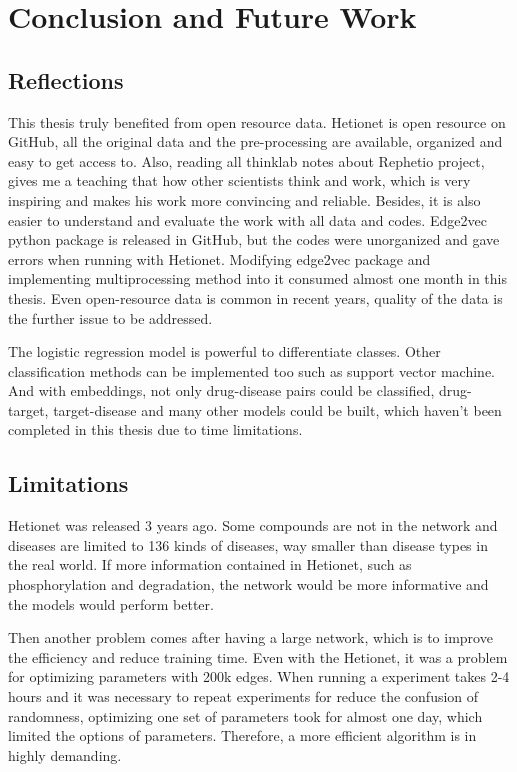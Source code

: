 \chapter{Conclusion and Future Work}\label{conclusion}
\section{Reflections}

This thesis truly benefited from open resource data. Hetionet is open resource on GitHub, all the original data and the pre-processing are available, organized and easy to get access to. Also, reading all thinklab notes about Rephetio project, gives me a teaching that how other scientists think and work, which is very inspiring and makes his work more convincing and reliable. Besides, it is also easier to understand and evaluate the work with all data and codes. Edge2vec python package is released in GitHub, but the codes were unorganized and gave errors when running with Hetionet. Modifying edge2vec package and implementing multiprocessing method into it consumed almost one month in this thesis. Even open-resource data is common in recent years, quality of the data is the further issue to be addressed.

The logistic regression model is powerful to differentiate classes. Other classification methods can be implemented too such as support vector machine. And with embeddings, not only drug-disease pairs could be classified, drug-target, target-disease and many other models could be built, which haven’t been completed in this thesis due to time limitations. 


\section{Limitations}

Hetionet was released 3 years ago. Some compounds are not in the network and diseases are limited to 136 kinds of diseases, way smaller than disease types in the real world. If more information contained in Hetionet, such as phosphorylation and degradation, the network would be more informative and the models would perform better. 

Then another problem comes after having a large network, which is to improve the efficiency and reduce training time. Even with the Hetionet, it was a problem for optimizing parameters with 200k edges. When running a experiment takes 2-4 hours and it was necessary to repeat experiments for reduce the confusion of randomness, optimizing one set of parameters took for almost one day, which limited the options of parameters. Therefore, a more efficient algorithm is in highly demanding.

